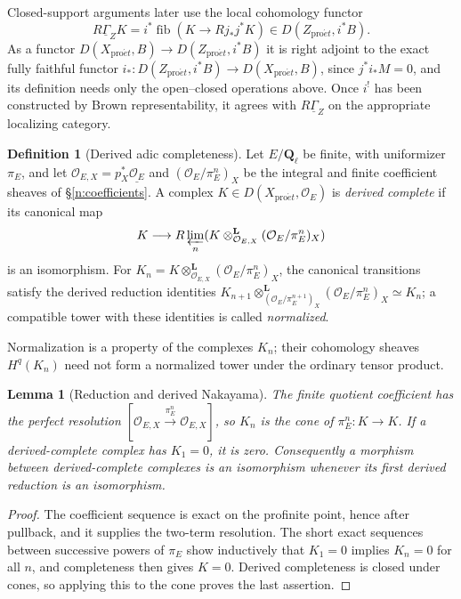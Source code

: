 \documentclass[11pt,a4paper]{article}
\numberwithin{equation}{section}
\newtheorem{lemma}[theorem]{Lemma}
\theoremstyle{definition}
\newtheorem{definition}[theorem]{Definition}
\theoremstyle{remark}
\newcommand{\Ql}{\mathbf Q_\ell}
\newcommand{\proet}{\mathrm{pro}\acute{e}t}
\begin{document}
Closed-support arguments later use the local cohomology functor
\[
 R\underline\Gamma_ZK
   =i^*\operatorname{fib}(K\longrightarrow Rj_*j^*K)
     \in D(Z_{\proet},i^*B).
\]
As a functor $D(X_{\proet},B)\to D(Z_{\proet},i^*B)$ it is right
adjoint to the exact fully faithful functor
$i_*\colon D(Z_{\proet},i^*B)\to D(X_{\proet},B)$, since
$j^*i_*M=0$, and its definition needs only the open--closed operations
above. Once $i^!$ has been constructed by Brown representability, it
agrees with $R\underline\Gamma_Z$ on the appropriate localizing
category.

\begin{definition}[Derived adic completeness]
\label{pe:derived-completion}
Let $E/\Ql$ be finite, with uniformizer $\pi_E$, and let
$\mathcal O_{E,X}=p_X^*\underline{\mathcal O_E}$ and
$(\mathcal O_E/\pi_E^n)_X$ be the integral and finite coefficient
sheaves of \S\ref{n:coefficients}. A complex $K\in D(X_{\proet},\mathcal O_E)$ is
\emph{derived complete} if its canonical map
\[
 K\longrightarrow R\varprojlim_n
       (K\otimes^{\mathbf L}_{\mathcal O_{E,X}}(\mathcal O_E/\pi_E^{n})_X)
\]
is an isomorphism. For $K_n=K\otimes^{\mathbf L}_{\mathcal O_{E,X}}(\mathcal O_E/\pi_E^{n})_X$,
the canonical transitions satisfy the derived reduction identities
$K_{n+1}\otimes^{\mathbf L}_{(\mathcal O_E/\pi_E^{n+1})_X}(\mathcal O_E/\pi_E^{n})_X\simeq K_n$;
a compatible tower with these identities is called \emph{normalized}.
\end{definition}
Normalization is a property of the complexes $K_n$; their cohomology
sheaves $H^q(K_n)$ need not form a normalized tower under the ordinary
tensor product.

\begin{lemma}[Reduction and derived Nakayama]
\label{pe:derived-nakayama}
The finite quotient coefficient has the perfect resolution
$[\mathcal O_{E,X}\xrightarrow{\pi_E^n}\mathcal O_{E,X}]$, so $K_n$ is the cone of
$\pi_E^n:K\to K$. If a derived-complete complex has $K_1=0$, it is
zero. Consequently a morphism between derived-complete complexes is
an isomorphism whenever its first derived reduction is an isomorphism.
\end{lemma}
\begin{proof}
The coefficient sequence is exact on the profinite point, hence after
pullback, and it supplies the two-term resolution. The short exact
sequences between successive powers of $\pi_E$ show inductively that
$K_1=0$ implies $K_n=0$ for all $n$, and completeness then gives
$K=0$. Derived completeness is closed under cones, so applying this to
the cone proves the last assertion.
\end{proof}
\end{document}
